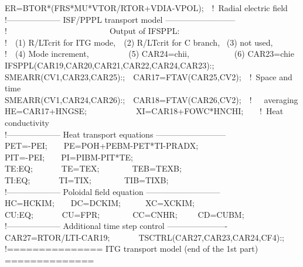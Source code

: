 {ER=BTOR*(FRS*MU*VTOR/RTOR+VDIA-VPOL);~~!~Radial electric field 
\\ \hspace*{1mm}
!-------------------- ISF/PPPL transport model --------------------------
\\ \hspace*{1mm}
!~~~~~~~~~~~~~~~~~~~~~~~~~Output of IFSPPL:
\\ \hspace*{1mm}
!~~(1) R/L\us Tcrit for ITG mode,~~(2) R/L\us Tcrit for C branch,
						~(3) not used,
\\ \hspace*{1mm}
!~~(4) Mode increment,
~~~~~~~~~(5) CAR24=chi\us i,~~~~~~~~~~~(6) CAR23=chi\us e
\\ \hspace*{1mm}
IFSPPL(CAR19,CAR20,CAR21,CAR22,CAR24,CAR23):;
\\ \hspace*{1mm}
SMEARR(CV1,CAR23,CAR25):;~~CAR17=FTAV(CAR25,CV2);~~!~Space and time
\\ \hspace*{1mm}
SMEARR(CV1,CAR24,CAR26):;~~CAR18=FTAV(CAR26,CV2);~~!~~~averaging
\\ \hspace*{1mm}
HE=CAR17+HNGSE;~~~~~~~~~~~~XI=CAR18+FOWC*HNCHI;~~~~!~Heat conductivity
\\ \hspace*{1mm}
!-------------------- Heat transport equations --------------------------
\\ \hspace*{1mm}
PET=-PEI;~~~~PE=POH+PEBM-PET*TI-PRADX;
\\ \hspace*{1mm}
PIT=-PEI;~~~~PI=PIBM-PIT*TE;
\\ \hspace*{1mm}
TE:EQ;~~~~~~~TE=TEX;~~~~~~~~TEB=TEXB;
\\ \hspace*{1mm}
TI:EQ;~~~~~~~TI=TIX;~~~~~~~~TIB=TIXB;
\\ \hspace*{1mm}
!-------------------- Poloidal field equation ---------------------------
\\ \hspace*{1mm}
HC=HCKIM;~~~~DC=DCKIM;~~~~~~XC=XCKIM;
\\ \hspace*{1mm}
CU:EQ;~~~~~~~CU=FPR;~~~~~~~~CC=CNHR;~~~~~CD=CUBM;
\\ \hspace*{1mm}
!-------------------- Additional time step control ----------------------
\\ \hspace*{1mm}
CAR27=RTOR/LTI-CAR19;~~~~~~~TSCTRL(CAR27,CAR23,CAR24,CF4):;
\\ \hspace*{1mm}
!=============== ITG transport model (end of the 1st part) ==============
\medskip\\ }
